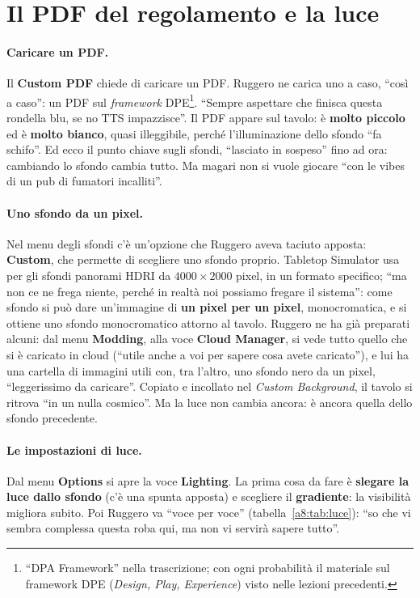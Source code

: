 \section{Il PDF del regolamento e la luce}
\label{a8:sec:luce}

\paragraph{Caricare un PDF.} Il \textbf{Custom PDF} chiede di caricare un PDF. Ruggero
ne carica uno a caso, ``così a caso'': un PDF sul \emph{framework} DPE\footnote{``DPA
Framework'' nella trascrizione; con ogni probabilità il materiale sul framework DPE
(\emph{Design, Play, Experience}) visto nelle lezioni precedenti.}. ``Sempre
aspettare che finisca questa rondella blu, se no TTS impazzisce''. Il PDF appare sul
tavolo: è \textbf{molto piccolo} ed è \textbf{molto bianco}, quasi illeggibile, perché
l'illuminazione dello sfondo ``fa schifo''. Ed ecco il punto chiave sugli sfondi,
``lasciato in sospeso'' fino ad ora: cambiando lo sfondo cambia tutto. Ma magari non si
vuole giocare ``con le vibes di un pub di fumatori incalliti''.

\paragraph{Uno sfondo da un pixel.} Nel menu degli sfondi c'è un'opzione che Ruggero
aveva taciuto apposta: \textbf{Custom}, che permette di scegliere uno sfondo proprio.
Tabletop Simulator usa per gli sfondi panorami HDRI da $4000\times2000$ pixel, in un
formato specifico; ``ma non ce ne frega niente, perché in realtà noi possiamo fregare il
sistema'': come sfondo si può dare un'immagine di \textbf{un pixel per un pixel},
monocromatica, e si ottiene uno sfondo monocromatico attorno al tavolo. Ruggero ne ha
già preparati alcuni: dal menu \textbf{Modding}, alla voce \textbf{Cloud Manager}, si
vede tutto quello che si è caricato in cloud (``utile anche a voi per sapere cosa avete
caricato''), e lui ha una cartella di immagini utili con, tra l'altro, uno sfondo nero
da un pixel, ``leggerissimo da caricare''. Copiato e incollato nel \emph{Custom
Background}, il tavolo si ritrova ``in un nulla cosmico''. Ma la luce non cambia
ancora: è ancora quella dello sfondo precedente.

\paragraph{Le impostazioni di luce.} Dal menu \textbf{Options} si apre la voce
\textbf{Lighting}. La prima cosa da fare è \textbf{slegare la luce dallo sfondo}
(c'è una spunta apposta) e scegliere il \textbf{gradiente}: la visibilità migliora
subito. Poi Ruggero va ``voce per voce'' (tabella~\ref{a8:tab:luce}): ``so che vi
sembra complessa questa roba qui, ma non vi servirà sapere tutto''.

